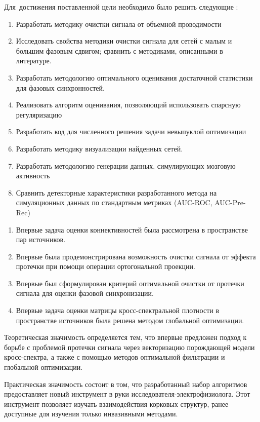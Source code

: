 Для~достижения поставленной цели необходимо было решить следующие {\tasks}:
\begin{enumerate}
  \item Разработать методику очистки сигнала от объемной проводимости
  \item Исследовать свойства методики очистки сигнала
        для сетей с малым и большим фазовым сдвигом;
        сравнить с методиками, описанными в литературе.
  \item Разработать методологию оптимального оценивания достаточной статистики
        для фазовых синхронностей.
  \item Реализовать алгоритм оценивания, позволяющий использовать спарсную регуляризацию
  \item Разработать код для численного решения задачи невыпуклой оптимизации
  \item Разработать методику визуализации найденных сетей.
  \item Разработать методологию генерации данных, симулирующих мозговую активность
  \item Сравнить детекторные характеристики разработанного метода на симуляционных данных
        по стандартным метриках (AUC-ROC, AUC-Pre-Rec)
\end{enumerate}


{\novelty}
\begin{enumerate}
  \item Впервые задача оценки коннективностей была рассмотрена в пространстве пар источников.
  \item Впервые была продемонстрирована возможность очистки сигнала от эффекта протечки 
        при помощи операции ортогональной проекции.
  \item Впервые был сформулирован критерий оптимальной очистки от протечки сигнала
      для оценки фазовой синхронизации.
  \item Впервые задача оценки матрицы кросс-спектральной плотности в пространстве источников
        была решена методом глобальной оптимизации.
\end{enumerate}

{\influence} 
Теоретическая значимость определяется тем, что
впервые предложен подход к борьбе с проблемой протечки
сигнала через векторизацию порождающей модели кросс-спектра,
а также с помощью методов оптимальной фильтрации и глобальной оптимизации.

Практическая значимость состоит в том, что разработанный набор алгоритмов
предоставляет новый инструмент в руки исследователя-электрофизиолога. Этот
инструмент позволяет изучать взаимодействия корковых структур, ранее
доступные для изучения только инвазивными методами.

